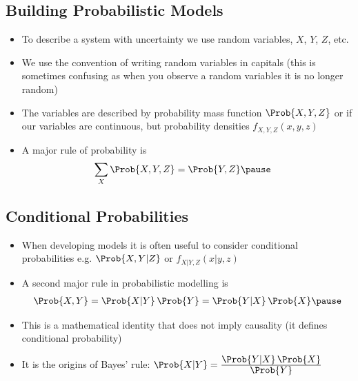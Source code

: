 \begin{slide}
\section[-1]{Building Probabilistic Models}

\begin{PauseHighLight}
  \begin{itemize}
  \item To describe a system with uncertainty we use random variables,
    $X$, $Y$, $Z$, etc.\pause
  \item We use the convention of writing random variables in capitals
    (this is sometimes confusing as when you observe a random variables
    it is no longer random)\pause
  \item The variables are described by probability mass function
    $\Prob{X,Y,Z}$ or if our variables are continuous, but probability
    densities $f_{X,Y,Z}(x,y,z)$\pause
  \item A major rule of probability is
    \begin{align*}
      \sum_X \Prob{X,Y,Z} &= \Prob{Y,Z}\pause
    \end{align*}
  \end{itemize}
\end{PauseHighLight}

\end{slide}


\begin{slide}
  \section{Conditional Probabilities}
  
\begin{PauseHighLight}
  \begin{itemize}
  \item When developing models it is often useful to consider
    conditional probabilities e.g.{} $\Prob{X,Y|Z}$ or
    $f_{X|Y,Z}(x|y,z)$\pause
  \item A second major rule in probabilistic modelling is
    \begin{align*}
      \Prob{X,Y} = \Prob{X|Y}\,\Prob{Y} = \Prob{Y|X}\,\Prob{X}\pause
    \end{align*}
  \item This is a mathematical identity that does not imply causality
    (it defines conditional probability)\pause
  \item It is the origins of Bayes' rule: $\Prob{X|Y} =
    \frac{\displaystyle \Prob{Y|X}\,\Prob{X}}{\displaystyle\Prob{Y}}$\pause
  \end{itemize}
\end{PauseHighLight}

\end{slide}



